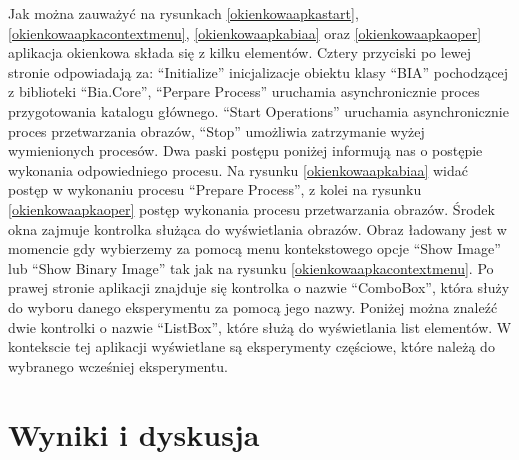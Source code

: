 \documentclass{article}
\begin{document}
{            \label{implementacjaokienko}
            \Large
            \justifying
            \quad
            Jak można zauważyć na rysunkach \ref{okienkowaapkastart}, \ref{okienkowaapkacontextmenu}, \ref{okienkowaapkabiaa} oraz \ref{okienkowaapkaoper}
            aplikacja okienkowa składa się z kilku elementów.
            Cztery przyciski po lewej stronie odpowiadają za: ``Initialize'' inicjalizacje obiektu klasy ``BIA'' pochodzącej z biblioteki ``Bia.Core'',
            ``Perpare Process'' uruchamia asynchronicznie proces przygotowania katalogu głównego.
            ``Start Operations'' uruchamia asynchronicznie proces przetwarzania obrazów,
            ``Stop'' umożliwia zatrzymanie wyżej wymienionych procesów.
            Dwa paski postępu poniżej informują nas o postępie wykonania odpowiedniego procesu.
            Na rysunku \ref{okienkowaapkabiaa} widać postęp w wykonaniu procesu ``Prepare Process'', z kolei na rysunku \ref{okienkowaapkaoper} postęp wykonania procesu przetwarzania obrazów.
            Środek okna zajmuje kontrolka służąca do wyświetlania obrazów. Obraz ładowany jest w momencie gdy wybierzemy za pomocą menu kontekstowego opcje ``Show Image'' lub ``Show Binary Image'' tak jak na rysunku \ref{okienkowaapkacontextmenu}.
            Po prawej stronie aplikacji znajduje się kontrolka o nazwie ``ComboBox'', która służy do wyboru danego eksperymentu za pomocą jego nazwy.
            Poniżej można znaleźć dwie kontrolki o nazwie ``ListBox'', które służą do wyświetlania list elementów.
            W kontekscie tej aplikacji wyświetlane są eksperymenty częściowe, które należą do wybranego wcześniej eksperymentu.
        }
    \newpage
    \section{Wyniki i dyskusja}
\end{document}
